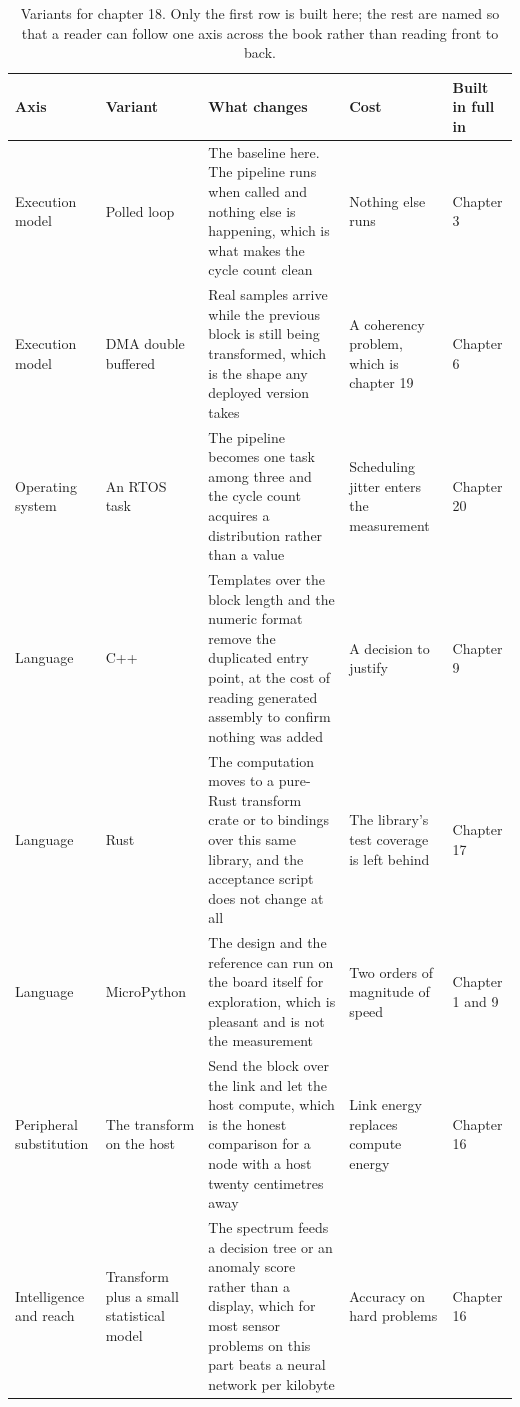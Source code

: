 \begin{table}[H]\centering\small
\begin{tabular}{p{24mm}p{26mm}p{44mm}p{22mm}p{20mm}}
\toprule
Axis & Variant & What changes & Cost & Built in full in \\
\midrule
Execution model & Polled loop & The baseline here. The pipeline runs when called and nothing else is happening, which is what makes the cycle count clean & Nothing else runs & Chapter 3 \\
Execution model & DMA double buffered & Real samples arrive while the previous block is still being transformed, which is the shape any deployed version takes & A coherency problem, which is chapter 19 & Chapter 6 \\
Operating system & An RTOS task & The pipeline becomes one task among three and the cycle count acquires a distribution rather than a value & Scheduling jitter enters the measurement & Chapter 20 \\
Language & C++ & Templates over the block length and the numeric format remove the duplicated entry point, at the cost of reading generated assembly to confirm nothing was added & A decision to justify & Chapter 9 \\
Language & Rust & The computation moves to a pure-Rust transform crate or to bindings over this same library, and the acceptance script does not change at all & The library's test coverage is left behind & Chapter 17 \\
Language & MicroPython & The design and the reference can run on the board itself for exploration, which is pleasant and is not the measurement & Two orders of magnitude of speed & Chapter 1 and 9 \\
Peripheral substitution & The transform on the host & Send the block over the link and let the host compute, which is the honest comparison for a node with a host twenty centimetres away & Link energy replaces compute energy & Chapter 16 \\
Intelligence and reach & Transform plus a small statistical model & The spectrum feeds a decision tree or an anomaly score rather than a display, which for most sensor problems on this part beats a neural network per kilobyte & Accuracy on hard problems & Chapter 16 \\
\bottomrule
\end{tabular}
\caption{Variants for chapter 18. Only the first row is built here; the rest are named so that a reader can follow one axis across the book rather than reading front to back.}
\end{table}

